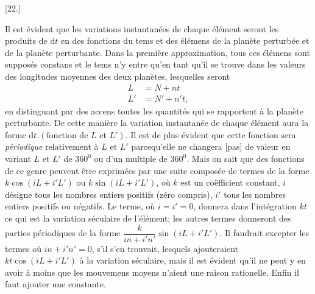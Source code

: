 \par{}\bigskip
{}
\begin{center}[22.]\end{center}
\begingroup
\setlength{\lineskip}{4pt}\setlength{\lineskiplimit}{4pt}
\noindent\hspace*{\parindent}Il est évident que les variations instantanées de chaque élément seront les produits de \(\mathrm{d}t\) en des fonctions du tems et des élémens de la planète perturbée et de la planète perturbante. Dans la première approximation, tous ces élémens sont supposés constans et le tems n’y entre qu’en tant qu’il se trouve dans les valeurs des longitudes moyennes des deux planètes, lesquelles seront
\[
\begin{aligned}
L&=N+nt\\
L'&=N'+n't,
\end{aligned}
\]
en distinguant par des accens toutes les quantités qui se rapportent à la planète perturbante. De cette manière la variation instantanée de chaque élément aura la forme \(\mathrm{d}t.(\text{fonction de }L\text{ et }L')\). Il est de plus évident que cette fonction sera \textit{périodique} relativement à \(L\text{ et }L'\) parcequ’elle ne changera [pas] de valeur en variant \(L\text{ et }L'\) de \(360^{0}\) ou d’un multiple de \(360^{0}\). Mais on sait que des fonctions de ce genre peuvent être exprimées par une suite composée de termes de la forme \(k\cos(iL+i'L')\) ou \(k\sin(iL+i'L')\), où \(k\) est un coëfficient constant, \(i\) désigne tous les nombres entiers positifs (zéro compris), \(i'\) tous les nombres entiers positifs ou négatifs. Le terme, où \(i=i'=0\), donnera dans l’intégration \(kt\) ce qui est la variation séculaire de l’élément; les autres termes donneront des parties périodiques de la forme \(\dfrac{k}{in+i'n'}\sin(iL+i'L')\). Il faudrait excepter les termes où \(in+i'n'=0\), s’il s’en trouvait, lesquels ajouteraient \(kt\cos(iL+i'L')\) à la variation séculaire, mais il est évident qu’il ne peut y en avoir à moins que les mouvemens moyens n’aient une raison rationelle. Enfin il faut ajouter une constante.
\par\endgroup
